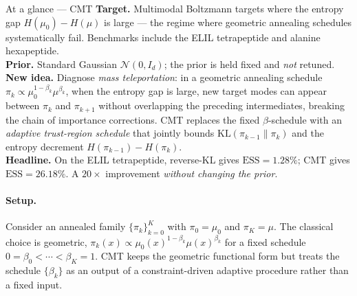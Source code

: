 \documentclass[11pt,letterpaper]{article}
\newcommand{\KLdiv}{\mathrm{KL}}
\newcommand{\ESS}{\mathrm{ESS}}
\theoremstyle{plain}
\begin{document}
\begin{methodbox}{At a glance --- CMT}
\textbf{Target.} Multimodal Boltzmann targets where the entropy gap
$H(\mu_0)-H(\mu)$ is large --- the regime where geometric annealing
schedules systematically fail. Benchmarks include the ELIL tetrapeptide and
alanine hexapeptide. \\
\textbf{Prior.} Standard Gaussian $\mathcal N(0,I_d)$; the prior is held
fixed and \emph{not} retuned. \\
\textbf{New idea.} Diagnose \emph{mass teleportation}: in a geometric
annealing schedule $\pi_k\propto\mu_0^{1-\beta_k}\mu^{\beta_k}$, when the
entropy gap is large, new target modes can appear between $\pi_k$ and
$\pi_{k+1}$ without overlapping the preceding intermediates, breaking the
chain of importance corrections. CMT replaces the fixed $\beta$-schedule
with an \emph{adaptive trust-region schedule} that jointly bounds
$\KLdiv(\pi_{k-1}\|\pi_k)$ and the entropy decrement $H(\pi_{k-1})-H(\pi_k)$. \\
\textbf{Headline.} On the ELIL tetrapeptide, reverse-KL gives
$\ESS=1.28\%$; CMT gives $\ESS=26.18\%$. A $20\times$ improvement
\emph{without changing the prior}.
\end{methodbox}

\paragraph{Setup.} Consider an annealed family $\{\pi_k\}_{k=0}^K$ with
$\pi_0=\mu_0$ and $\pi_K=\mu$. The classical choice is geometric,
$\pi_k(x)\propto\mu_0(x)^{1-\beta_k}\mu(x)^{\beta_k}$ for a fixed schedule
$0=\beta_0<\cdots<\beta_K=1$. CMT keeps the geometric functional form but
treats the schedule $\{\beta_k\}$ as an output of a constraint-driven
adaptive procedure rather than a fixed input.
\end{document}
